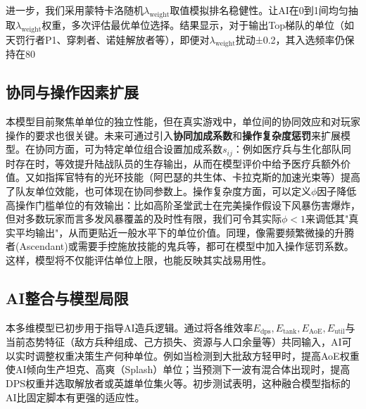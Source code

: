 \documentclass[a4paper,12pt]{article}
\begin{document}
\begin{CJK}{UTF8}{gbsn}
进一步，我们采用蒙特卡洛随机$\lambda_{\text{weight}}$取值模拟排名稳健性。让AI在0到1间均匀抽取$\lambda_{\text{weight}}$权重，多次评估最优单位选择。结果显示，对于输出Top梯队的单位（如天罚行者P1、穿刺者、诺娃解放者等），即便对$\lambda_{\text{weight}}$扰动±0.2，其入选频率仍保持在80%

\subsection{协同与操作因素扩展}
本模型目前聚焦单单位的独立性能，但在真实游戏中，单位间的协同效应和对玩家操作的要求也很关键。未来可通过引入\textbf{协同加成系数}和\textbf{操作复杂度惩罚}来扩展模型。在协同方面，可为特定单位组合设置加成系数$s_{ij}$：例如医疗兵与生化部队同时存在时，等效提升陆战队员的生存输出，从而在模型评价中给予医疗兵额外价值。又如指挥官特有的光环技能（阿巴瑟的共生体、卡拉克斯的加速光束等）提高了队友单位效能，也可体现在协同参数上。操作复杂度方面，可以定义$\phi$因子降低高操作门槛单位的有效输出：比如高阶圣堂武士在完美操作假设下风暴伤害爆炸，但对多数玩家而言多发风暴覆盖的及时性有限，我们可令其实际$\phi<1$来调低其"真实平均输出"，从而更贴近一般水平下的单位价值。同理，像需要频繁微操的升腾者(Ascendant)或需要手控施放技能的鬼兵等，都可在模型中加入操作惩罚系数。这样，模型将不仅能评估单位上限，也能反映其实战易用性。

\subsection{AI整合与模型局限}
本多维模型已初步用于指导AI造兵逻辑。通过将各维效率${E_{\text{dps}}, E_{\text{tank}}, E_{\text{AoE}}, E_{\text{util}}}$与当前态势特征（敌方兵种组成、己方损失、资源与人口余量等）共同输入，AI可以实时调整权重决策生产何种单位。例如当检测到大批敌方轻甲时，提高AoE权重使AI倾向生产坦克、高爽（Splash）单位；当预测下一波有混合体出现时，提高DPS权重并选取解放者或英雄单位集火等。初步测试表明，这种融合模型指标的AI比固定脚本有更强的适应性。


\end{CJK}
\end{document}
